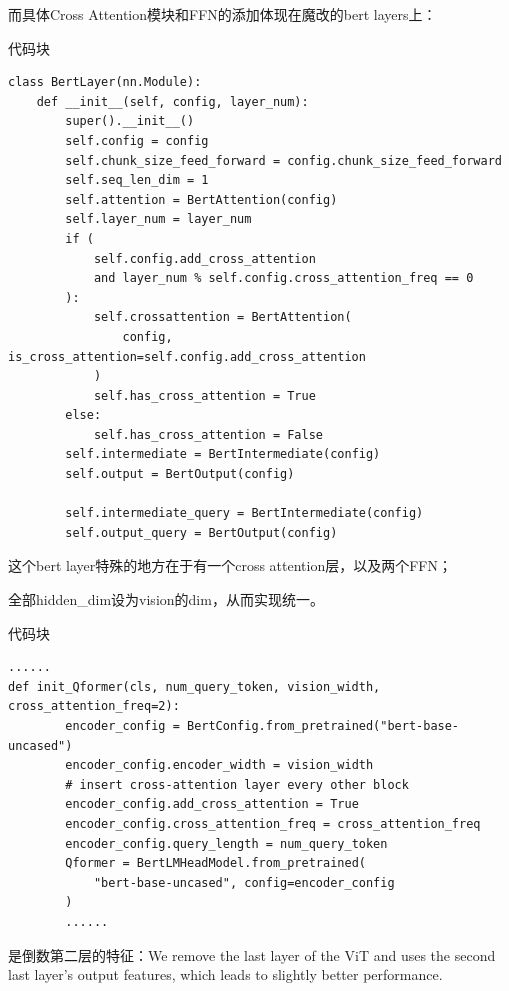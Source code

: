 \documentclass[zihao=false,fontset=windows]{ctexart}
\newcommand{\codehead}{{\small\ttfamily\color{feishuGray}代码块}\par\vspace{-0.15em}}
\begin{document}
而具体Cross Attention模块和FFN的添加体现在魔改的bert layers上：\par

\begin{feishucode}
\codehead
\begin{lstlisting}
class BertLayer(nn.Module):
    def __init__(self, config, layer_num):
        super().__init__()
        self.config = config
        self.chunk_size_feed_forward = config.chunk_size_feed_forward
        self.seq_len_dim = 1
        self.attention = BertAttention(config)
        self.layer_num = layer_num
        if (
            self.config.add_cross_attention
            and layer_num % self.config.cross_attention_freq == 0
        ):
            self.crossattention = BertAttention(
                config, is_cross_attention=self.config.add_cross_attention
            )
            self.has_cross_attention = True
        else:
            self.has_cross_attention = False
        self.intermediate = BertIntermediate(config)
        self.output = BertOutput(config)

        self.intermediate_query = BertIntermediate(config)
        self.output_query = BertOutput(config)
\end{lstlisting}
\end{feishucode}

这个bert layer特殊的地方在于有一个cross attention层，以及两个FFN；\par

\par\vspace{0.6em}\par\vspace{0.2em}

全部hidden\_dim设为vision的dim，从而实现统一。\par

\begin{feishucode}
\codehead
\begin{lstlisting}
......
def init_Qformer(cls, num_query_token, vision_width, cross_attention_freq=2):
        encoder_config = BertConfig.from_pretrained("bert-base-uncased")
        encoder_config.encoder_width = vision_width
        # insert cross-attention layer every other block
        encoder_config.add_cross_attention = True
        encoder_config.cross_attention_freq = cross_attention_freq
        encoder_config.query_length = num_query_token
        Qformer = BertLMHeadModel.from_pretrained(
            "bert-base-uncased", config=encoder_config
        )
        ......
\end{lstlisting}
\end{feishucode}

\par\vspace{0.6em}\par\vspace{0.2em}

是倒数第二层的特征：We remove the last layer of the ViT and uses the second last layer’s output features, which leads to slightly better performance.\par
\end{document}
